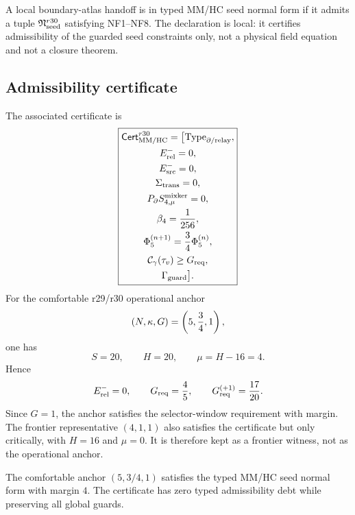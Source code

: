 \begin{definition}
\label{def:v470-r30-typed-seed-normal-form}
A local boundary-atlas handoff is in typed MM/HC seed normal form if it admits a
tuple \(\mathfrak N_{\rm seed}^{r30}\) satisfying NF1--NF8.  The declaration is
local: it certifies admissibility of the guarded seed constraints only, not a
physical field equation and not a closure theorem.
\end{definition}

\subsection{Admissibility certificate}
\label{subsec:v470-r30-admissibility-certificate}

The associated certificate is
\[
\boxed{
\begin{gathered}
\mathsf{Cert}_{\rm MM/HC}^{r30}
=
\bigl[
\mathrm{Type}_{\partial/{\rm relay}},\\
E_{\rm rel}^{-}=0,\\
E_{\rm src}^{-}=0,\\
\Sigma_{\rm trans}=0,\\
P_{\partial}S_{4,\mu}^{\rm mixker}=0,\\
\beta_4={1\over256},\\
\Phi_5^{(n+1)}={3\over4}\Phi_5^{(n)},\\
\mathcal C_{\gamma}(\tau_v)\geq G_{\rm req},\\
\Gamma_{\rm guard}
\bigr].
\end{gathered}
}
\]
For the comfortable r29/r30 operational anchor
\[
(N,\kappa,G)=\left(5,{3\over4},1\right),
\]
one has
\[
S=20,
\qquad
H=20,
\qquad
\mu=H-16=4.
\]
Hence
\[
E_{\rm rel}^{-}=0,
\qquad
G_{\rm req}={4\over5},
\qquad
G_{\rm req}^{(+1)}={17\over20}.
\]
Since \(G=1\), the anchor satisfies the selector-window requirement with margin.
The frontier representative \((4,1,1)\) also satisfies the certificate but only
critically, with \(H=16\) and \(\mu=0\).  It is therefore kept as a frontier
witness, not as the operational anchor.

\begin{proposition}
\label{prop:v470-r30-local-admissibility-certificate}
The comfortable anchor \((5,3/4,1)\) satisfies the typed MM/HC seed normal form
with margin \(4\).  The certificate has zero typed admissibility debt while
preserving all global guards.
\end{proposition}

